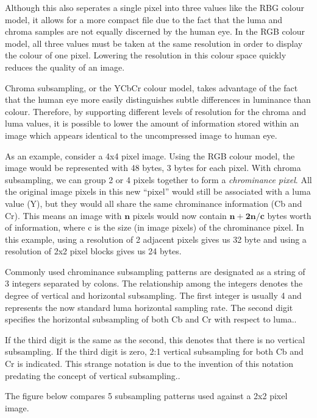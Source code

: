 Although this also seperates a single pixel into three values like the RBG colour model, 
it allows for a more compact file due to the fact that the luma and chroma samples 
are not equally discerned by the human eye. 
In the RGB colour model, all three values must be taken at the same resolution in order to display the colour of one pixel. 
Lowering the resolution in this colour space quickly reduces the quality of an image. 

Chroma subsampling, or the YCbCr colour model, takes advantage of the fact that the human eye 
more easily distinguishes subtle differences in luminance than colour. \cite{kerr_chroma_subsampling} 
Therefore, by supporting different levels of resolution for the chroma and luma values, 
it is possible to lower the amount of information stored
 within an image which appears identical to the uncompressed image to human eye.

As an example, consider a 4x4 pixel image. 
Using the RGB colour model, the image would be represented with 48 bytes, 3 bytes for each pixel. 
With chroma subsampling, we can group 2 or 4 pixels together to form a \emph{chrominance pixel}. 
All the original image pixels in this new ``pixel'' would still be associated with a luma value (Y), but 
they would all share the same chrominance information (Cb and Cr). 
This means an image with $\mathbf{n}$ pixels would 
now contain $\mathbf{n+2n/c}$ bytes worth of information, where 
c is the size (in image pixels) of the chrominance pixel. 
In this example, using a resolution of 2 adjacent pixels 
gives us 32 byte and using a resolution of 2x2 pixel blocks 
gives us 24 bytes.

Commonly used chrominance subsampling patterns are designated as 
a string of 3 integers separated by colons. 
The relationship among the integers denotes 
the degree of vertical and horizontal subsampling.
The first integer is usually 4 and represents the 
now standard luma horizontal sampling rate. 
The second digit specifies the horizontal subsampling of 
both Cb and Cr with respect to luma.\cite{poynton_chroma_subsampling}.

If the third digit is the same as the second,
this denotes that there is no vertical subsampling.
If the third digit is zero, 2:1 vertical subsampling
for both Cb and Cr is indicated. This strange notation
is due to the invention of this notation
predating the concept of vertical subsampling.\cite{poynton_chroma_subsampling}.

The figure below compares 5 subsampling patterns used against a 2x2 pixel image.

